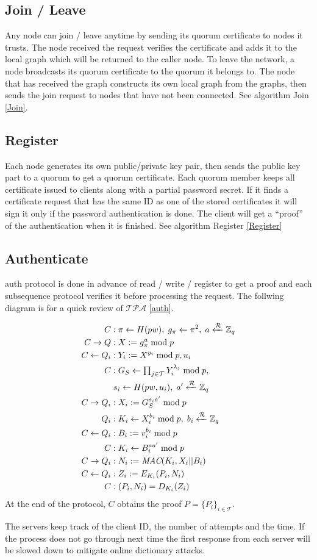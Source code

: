 \subsection{Join / Leave}
Any node can join / leave anytime by sending its quorum certificate to
nodes it trusts. The node received the request verifies the
certificate and adds it to the local graph which will be returned to
the caller node. To leave the network, a node broadcasts its quorum
certificate to the quorum it belongs to.
The node that has received the graph constructs its own local graph
from the graphs, then sends the join request to nodes that have not
been connected.
See algorithm {\sf Join} \ref{Join}.

\subsection{Register}
\label{register}
Each node generates its own public/private key pair, then sends the
public key part to a quorum to get a quorum certificate. Each quorum
member keeps all certificate issued to clients along with a partial
password secret. If it finds a certificate request that has the same
ID as one of the stored certificates it will sign it only if the
password authentication is done. The client will get a ``proof'' of
the authentication when it is finished.
See algorithm {\sf Register} \ref{Register}

\subsection{Authenticate}
\label{authenticate}
{\sf auth} protocol is done in advance of {\sf read / write /
  register} to get a proof and each subsequence protocol verifies it
before processing the request. The follwing diagram is for a quick
review of $\mathcal{TPA}$ \ref{auth}.

\begin{align*}
  C &: \pi \leftarrow H(pw), \;
      g_{\pi} \leftarrow \pi^2, \;
      a \xleftarrow{\mathcal{R}} \mathbb{Z}_q \\
  C \rightarrow Q &: X := g_{\pi}^a \bmod p \\
  C \leftarrow Q_i &: Y_i := X^{y_i} \bmod p, u_i \\
  C &: G_S \leftarrow \textstyle \prod_{j \in \mathcal{T}}Y_i^{\lambda_j} \bmod p, \\
    & \; s_i \leftarrow H(pw, u_i), \;
      a' \xleftarrow{\mathcal{R}} \mathbb{Z}_q \\
  C \rightarrow Q_i &: X_i := G_S^{s_ia'} \bmod p \\
  Q_i &: K_i \leftarrow X_i^{b_i} \bmod p, \;
        b_i \xleftarrow{\mathcal{R}} \mathbb{Z}_q \\
  C \leftarrow Q_i &: B_i := v_i^{b_i} \bmod p \\
  C &: K_i \leftarrow B_i^{aa'} \bmod p \\
  C \rightarrow Q_i &: N_i := \text{\em MAC}(K_i, X_i || B_i) \\
  C \leftarrow Q_i &: Z_i := E_{K_i}(P_i, N_i) \\
  C &: (P_i, N_i) = D_{K_i}(Z_i)
\end{align*}
At the end of the protocol, $C$ obtains the proof $P = \{P_i\}_{i \in
  \mathcal{T}}$.

The servers keep track of the client ID, the number of attempts and
the time. If the process does not go through next time the first
response from each server will be slowed down to mitigate online
dictionary attacks.
